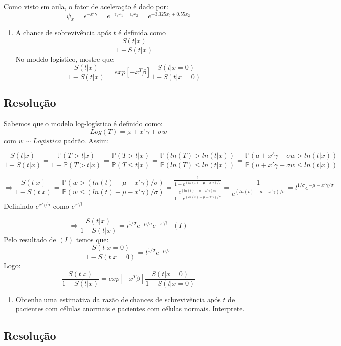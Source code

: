 \documentclass[]{article}
\providecommand{\tightlist}{%
  \setlength{\itemsep}{0pt}\setlength{\parskip}{0pt}}
\begin{document}
Como visto em aula, o fator de aceleração é dado por:
\[\psi_x=e^{-x'\gamma}=e^{-\gamma_1x_1-\gamma_2x_2}=e^{-3.325x_1+0.55x_2}\]

\begin{enumerate}
\def\labelenumi{(\alph{enumi})}
\setcounter{enumi}{2}
\tightlist
\item
  A chance de sobrevivência após \(t\) é definida como
  \[\frac{S(t|x)}{1-S(t|x)}\] No modelo logístico, mostre que:
  \[\frac{S(t|x)}{1-S(t|x)}=exp[-x^T \beta]\frac{S(t|x=0)}{1-S(t|x=0)}\]
\end{enumerate}

\subsection{Resolução}\label{resolucao-11}

Sabemos que o modelo log-logístico é definido como:
\[Log(T)=\mu +x'\gamma+ \sigma w\] com \(w\sim Logistica\) padrão.
Assim:

\[\frac{S(t|x)}{1-S(t|x)}=\frac{\mathbb{P}(T>t|x)}{1-\mathbb{P}(T>t|x)}=\frac{\mathbb{P}(T>t|x)}{\mathbb{P}(T \le t|x)}=\frac{\mathbb{P}(ln(T)>ln(t|x))}{\mathbb{P}(ln(T) \le ln(t|x))}=\frac{\mathbb{P}(\mu+x'\gamma+ \sigma w>ln(t|x))}{\mathbb{P}(\mu+x'\gamma+ \sigma w \le ln(t|x))}\]

\[\Rightarrow \frac{S(t|x)}{1-S(t|x)}=\frac{\mathbb{P}( w>(ln(t)-\mu-x'\gamma)/\sigma)}{\mathbb{P}( w \le (ln(t)-\mu-x'\gamma)/\sigma)}=\frac{\frac{1}{1+ e^{(ln(t)-\mu-x'\gamma)/\sigma}}}{\frac{e^{(ln(t)-\mu-x'\gamma)/\sigma}}{1+ e^{(ln(t)-\mu-x'\gamma)/\sigma}}}=\frac{1}{e^{(ln(t)-\mu-x'\gamma)/\sigma}}=t^{1/\sigma}e^{-\mu-x'\gamma/\sigma}\]
Definindo \(e^{x'\gamma/\sigma}\) como \(e^{x'\beta}\)

\[\Rightarrow \frac{S(t|x)}{1-S(t|x)}=t^{1/\sigma}e^{-\mu/\sigma}e^{-x'\beta} \ \ \ \ (I)\]
Pelo resultado de \((I)\) temos que:
\[\frac{S(t|x=0)}{1-S(t|x=0)}=t^{1/\sigma}e^{-\mu/\sigma}\] Logo:
\[\frac{S(t|x)}{1-S(t|x)}=exp[-x^T \beta]\frac{S(t|x=0)}{1-S(t|x=0)}\]

\begin{enumerate}
\def\labelenumi{(\alph{enumi})}
\setcounter{enumi}{3}
\tightlist
\item
  Obtenha uma estimativa da razão de chances de sobrevivência após \(t\)
  de pacientes com células anormais e pacientes com células normais.
  Interprete.
\end{enumerate}

\subsection{Resolução}\label{resolucao-12}
\end{document}

